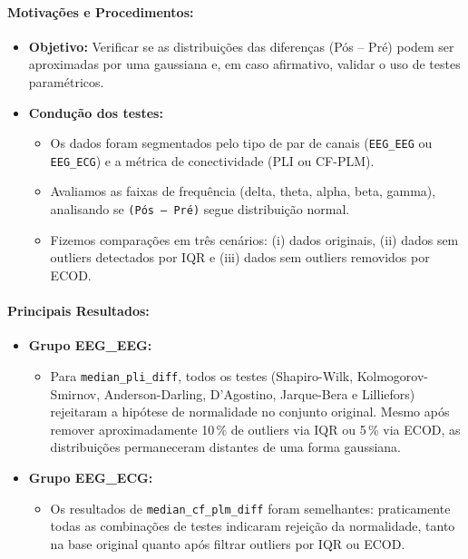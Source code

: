\paragraph{Motivações e Procedimentos:}
\begin{itemize}
    \item \textbf{Objetivo:} Verificar se as distribuições das diferenças (Pós -- Pré) podem ser aproximadas por uma gaussiana e, em caso afirmativo, validar o uso de testes paramétricos.
    \item \textbf{Condução dos testes:} 
    \begin{itemize}
        \item Os dados foram segmentados pelo tipo de par de canais (\texttt{EEG\_EEG} ou \texttt{EEG\_ECG}) e a métrica de conectividade (PLI ou CF-PLM).
        \item Avaliamos as faixas de frequência (delta, theta, alpha, beta, gamma), analisando se \texttt{(Pós -- Pré)} segue distribuição normal.
        \item Fizemos comparações em três cenários: (i) dados originais, (ii) dados sem outliers detectados por IQR e (iii) dados sem outliers removidos por ECOD.
    \end{itemize}
\end{itemize}

\paragraph{Principais Resultados:}
\begin{itemize}
    \item \textbf{Grupo EEG\_EEG:}
    \begin{itemize}
        \item Para \texttt{median\_pli\_diff}, todos os testes (Shapiro-Wilk, Kolmogorov-Smirnov, Anderson-Darling, D'Agostino, Jarque-Bera e Lilliefors) rejeitaram a hipótese de normalidade no conjunto original. Mesmo após remover aproximadamente 10\,\% de outliers via IQR ou 5\,\% via ECOD, as distribuições permaneceram distantes de uma forma gaussiana.
    \end{itemize}
    \item \textbf{Grupo EEG\_ECG:}
    \begin{itemize}
        \item Os resultados de \texttt{median\_cf\_plm\_diff} foram semelhantes: praticamente todas as combinações de testes indicaram rejeição da normalidade, tanto na base original quanto após filtrar outliers por IQR ou ECOD.
    \end{itemize}
\end{itemize}

